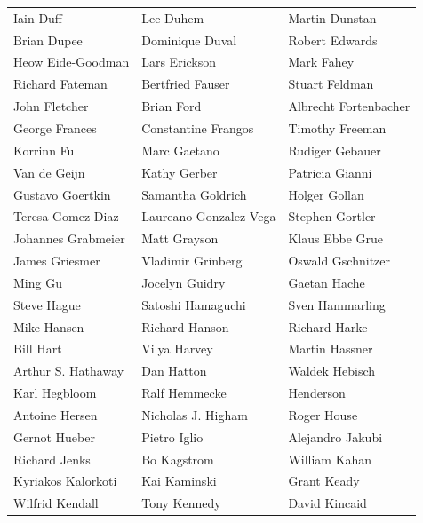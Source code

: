 \begin{tabular}{lll}
Iain Duff              & Lee Duhem              & Martin Dunstan\\
Brian Dupee            & Dominique Duval        & Robert Edwards\\
Heow Eide-Goodman      & Lars Erickson          & Mark Fahey\\
Richard Fateman        & Bertfried Fauser       & Stuart Feldman\\
John Fletcher          & Brian Ford             & Albrecht Fortenbacher\\
George Frances         & Constantine Frangos    & Timothy Freeman\\
Korrinn Fu             & Marc Gaetano           & Rudiger Gebauer\\
Van de Geijn           & Kathy Gerber           & Patricia Gianni\\
Gustavo Goertkin       & Samantha Goldrich      & Holger Gollan\\
Teresa Gomez-Diaz      & Laureano Gonzalez-Vega & Stephen Gortler\\
Johannes Grabmeier     & Matt Grayson           & Klaus Ebbe Grue\\
James Griesmer         & Vladimir Grinberg      & Oswald Gschnitzer\\
Ming Gu                & Jocelyn Guidry         & Gaetan Hache\\
Steve Hague            & Satoshi Hamaguchi      & Sven Hammarling\\
Mike Hansen            & Richard Hanson         & Richard Harke\\
Bill Hart              & Vilya Harvey           & Martin Hassner\\
Arthur S. Hathaway     & Dan Hatton             & Waldek Hebisch\\
Karl Hegbloom          & Ralf Hemmecke          & Henderson\\
Antoine Hersen         & Nicholas J. Higham     & Roger House\\
Gernot Hueber          & Pietro Iglio           & Alejandro Jakubi\\
Richard Jenks          & Bo Kagstrom            & William Kahan\\
Kyriakos Kalorkoti     & Kai Kaminski           & Grant Keady\\
Wilfrid Kendall        & Tony Kennedy           & David Kincaid\\
\end{tabular}
\vfill
\newpage

